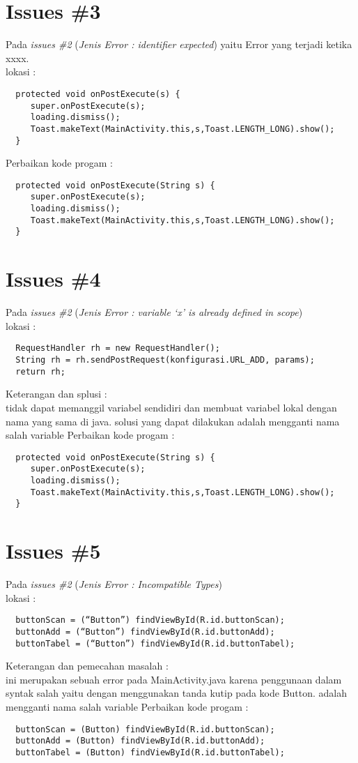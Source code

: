 \section{Issues \#3}
Pada \textit{issues \#2} (\textit{Jenis Error : identifier expected}) yaitu Error yang terjadi ketika xxxx.
\\lokasi :
\begin{verbatim}
  protected void onPostExecute(s) {
     super.onPostExecute(s);
     loading.dismiss();
     Toast.makeText(MainActivity.this,s,Toast.LENGTH_LONG).show();
  }
\end{verbatim}
Perbaikan kode progam :\begin{verbatim}
  protected void onPostExecute(String s) {
     super.onPostExecute(s);
     loading.dismiss();
     Toast.makeText(MainActivity.this,s,Toast.LENGTH_LONG).show();
  }
\end{verbatim}

\section{Issues \#4}
Pada \textit{issues \#2} (\textit{Jenis Error : variable ‘x’ is already defined in scope})
\\lokasi :
\begin{verbatim}
  RequestHandler rh = new RequestHandler();
  String rh = rh.sendPostRequest(konfigurasi.URL_ADD, params);
  return rh;
\end{verbatim}
Keterangan dan splusi :
\\tidak dapat memanggil variabel sendidiri dan membuat variabel lokal dengan nama yang sama di java. solusi yang dapat dilakukan adalah mengganti nama salah variable
Perbaikan kode progam :\begin{verbatim}
  protected void onPostExecute(String s) {
     super.onPostExecute(s);
     loading.dismiss();
     Toast.makeText(MainActivity.this,s,Toast.LENGTH_LONG).show();
  }
\end{verbatim}

\section{Issues \#5}
Pada \textit{issues \#2} (\textit{Jenis Error : Incompatible Types})
\\lokasi :
\begin{verbatim}
  buttonScan = (“Button”) findViewById(R.id.buttonScan);
  buttonAdd = (“Button”) findViewById(R.id.buttonAdd);
  buttonTabel = (“Button”) findViewById(R.id.buttonTabel);
\end{verbatim}
Keterangan dan pemecahan masalah :
\\ini merupakan sebuah error pada MainActivity.java karena penggunaan dalam syntak salah yaitu dengan menggunakan tanda kutip pada kode Button. adalah mengganti nama salah variable
Perbaikan kode progam :\begin{verbatim}
  buttonScan = (Button) findViewById(R.id.buttonScan);
  buttonAdd = (Button) findViewById(R.id.buttonAdd);
  buttonTabel = (Button) findViewById(R.id.buttonTabel);
\end{verbatim}

